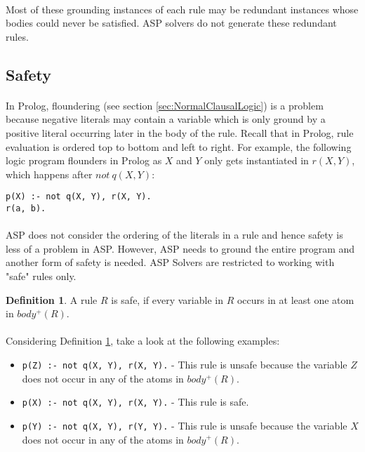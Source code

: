 \documentclass{article}
\theoremstyle{plain}
\theoremstyle{definition}
\newtheorem{defn}[thm]{Definition} %
\begin{document}
\begin{multicols}{2}
\paragraph{} Most of these grounding instances of each rule may be redundant instances whose bodies could never be satisfied. ASP solvers do not generate these redundant rules.

\subsection{Safety}

\paragraph{} In Prolog, floundering (see section \ref{sec:NormalClausalLogic}) is a problem because negative literals may contain a variable which is only ground by a positive literal occurring later in the body of the rule. Recall that in Prolog, rule evaluation is ordered top to bottom and left to right. For example, the following logic program flounders in Prolog as $X$ and $Y$ only gets instantiated in $r(X, Y)$, which happens after $not\ q(X, Y)$:

\begin{lstlisting}
p(X) :- not q(X, Y), r(X, Y).
r(a, b).
\end{lstlisting}

\paragraph{} ASP does not consider the ordering of the literals in a rule and hence safety is less of a problem in ASP.  However, ASP needs to ground the entire program and another form of safety is needed. ASP Solvers are restricted to working with "safe" rules only.

\begin{defn}\label{defn:SafeRule}
A rule $R$ is safe, if every variable in $R$ occurs in at least one atom in $body^+(R)$. 
\end{defn}

\paragraph{} Considering Definition \ref{defn:SafeRule}, take a look at the following examples:

\begin{itemize}
\item \lstinline{p(Z) :- not q(X, Y), r(X, Y).} - This rule is unsafe because the variable $Z$ does not occur in any of the atoms in $body^+(R)$.
\item \lstinline{p(X) :- not q(X, Y), r(X, Y).} - This rule is safe.
\item \lstinline{p(Y) :- not q(X, Y), r(Y, Y).} - This rule is unsafe because the variable $X$ does not occur in any of the atoms in $body^+(R)$.
\end{itemize}


\end{multicols}
\end{document}
